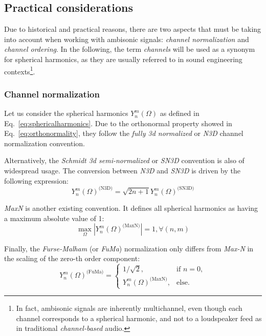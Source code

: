 \subsection{Practical considerations}

Due to historical and practical reasons, there are two aspects that must be taking into account when working with ambisonic signals: \textit{channel normalization} and \textit{channel ordering}. 
In the following, the term \textit{channels} will be used as a synonym for spherical harmonics, as they are usually referred to in sound engineering contexts\footnote{In fact, ambisonic signals are inherently multichannel, even though each channel corresponds to a spherical harmonic, and not to a loudspeaker feed as in traditional \textit{channel-based} audio.}.  \\


\subsubsection{Channel normalization}
Let us consider the spherical harmonics $Y_n^m(\Omega)$ as defined in Eq.~\ref{eq:sphericalharmonics}. Due to the orthonormal property showed in Eq.~\ref{eq:orthonormality}, they follow the \textit{fully 3d normalized} or \textit{N3D} channel normalization convention. 

Alternatively, the \textit{Schmidt 3d semi-normalized} or \textit{SN3D} \cite{daniel2000representation} convention is also of widespread usage. The conversion between \textit{N3D} and \textit{SN3D} is driven by the following expression:
\begin{equation}
	{Y_n^m(\Omega)}^{\text{(N3D)}} = \sqrt{2n+1} {Y_n^m(\Omega)}^{\text{(SN3D)}}
\end{equation}

\textit{MaxN} is another existing convention. It defines all spherical harmonics as having a maximum absolute value of 1: 
\begin{equation}
	\max_{\Omega} |{Y_n^m(\Omega)}^{\text{(MaxN)}}| = 1, \forall (n, m)
\end{equation} 

Finally, the \textit{Furse-Malham} (or \textit{FuMa}) normalization only differs from \textit{Max-N} in the scaling of the zero-th order component: 
\begin{equation}
	{Y_n^m(\Omega)}^{\text{(FuMa)}} = \begin{cases}
		1 / \sqrt{2},  &\text{if } n = 0,\\
		{Y_n^m(\Omega)}^{\text{(MaxN)}},  &\text{else}.
	\end{cases}	
\end{equation} 

